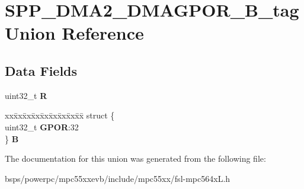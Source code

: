 \hypertarget{unionSPP__DMA2__DMAGPOR__32B__tag}{}\section{S\+P\+P\+\_\+\+D\+M\+A2\+\_\+\+D\+M\+A\+G\+P\+O\+R\+\_\+B\+\_\+tag Union Reference}
\label{unionSPP__DMA2__DMAGPOR__32B__tag}
\subsection*{Data Fields}
\begin{DoxyCompactItemize}
\item 
\mbox{\label{unionSPP__DMA2__DMAGPOR__32B__tag_ae6a780bab3803b58cbe6fd70a7f78d8f}} 
uint32\+\_\+t {\bfseries R}
\item 
\mbox{\label{unionSPP__DMA2__DMAGPOR__32B__tag_a15a9a9ef2d6214286a679b2b7bdc3b3e}} 
\begin{tabbing}
xx\=xx\=xx\=xx\=xx\=xx\=xx\=xx\=xx\=\kill
struct \{\\
\>uint32\_t {\bfseries GPOR}:32\\
\} {\bfseries B}\\

\end{tabbing}\end{DoxyCompactItemize}


The documentation for this union was generated from the following file\+:\begin{DoxyCompactItemize}
\item 
bsps/powerpc/mpc55xxevb/include/mpc55xx/fsl-\/mpc564x\+L.\+h\end{DoxyCompactItemize}

